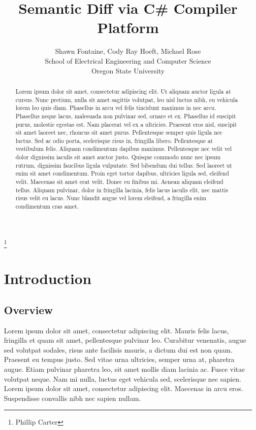 \documentclass[draftclsnofoot,onecolumn]{IEEEtran}
\begin{document}
\lstset{style=cSharp}
\title{Semantic Diff via C\# Compiler Platform}

\author{Shawn Fontaine, Cody Ray Hoeft, Michael Rose\\
	School of Electrical Engineering and Computer Science\\
	Oregon State University}


\begin{abstract}
Lorem ipsum dolor sit amet, consectetur adipiscing elit. Ut aliquam auctor ligula at cursus. Nunc pretium, nulla sit amet sagittis volutpat, leo nisl luctus nibh, eu vehicula lorem leo quis diam. Phasellus in arcu vel felis tincidunt maximus in nec arcu. Phasellus neque lacus, malesuada non pulvinar sed, ornare et ex. Phasellus id suscipit purus, molestie egestas est. Nam placerat vel ex a ultricies. Praesent eros nisl, suscipit sit amet laoreet nec, rhoncus sit amet purus. Pellentesque semper quis ligula nec luctus. Sed ac odio porta, scelerisque risus in, fringilla libero. Pellentesque at vestibulum felis. Aliquam condimentum dapibus maximus. Pellentesque nec velit vel dolor dignissim iaculis sit amet auctor justo. Quisque commodo nunc nec ipsum rutrum, dignissim faucibus ligula vulputate. Sed bibendum dui tellus. Sed laoreet ut enim sit amet condimentum. Proin eget tortor dapibus, ultricies ligula sed, eleifend velit. Maecenas sit amet erat velit. Donec eu finibus mi. Aenean aliquam eleifend tellus. Aliquam pulvinar, dolor in fringilla lacinia, felis lacus iaculis elit, nec mattis risus velit eu lacus. Nunc blandit augue vel lorem eleifend, a fringilla enim condimentum cras amet.
\end{abstract}

\thanks{Phillip Carter}

\maketitle

\newpage

\section{Introduction}
\subsection{Overview}
Lorem ipsum dolor sit amet, consectetur adipiscing elit. Mauris felis lacus, fringilla et quam sit amet, pellentesque pulvinar leo. Curabitur venenatis, augue sed volutpat sodales, risus ante facilisis mauris, a dictum dui est non quam. Praesent eu tempus justo. Sed vitae urna ultricies, semper urna at, pharetra augue. Etiam pulvinar pharetra leo, sit amet mollis diam lacinia ac. Fusce vitae volutpat neque. Nam mi nulla, luctus eget vehicula sed, scelerisque nec sapien. Lorem ipsum dolor sit amet, consectetur adipiscing elit. Maecenas in arcu eros. Suspendisse convallis nibh nec sapien nullam.
\end{document}
